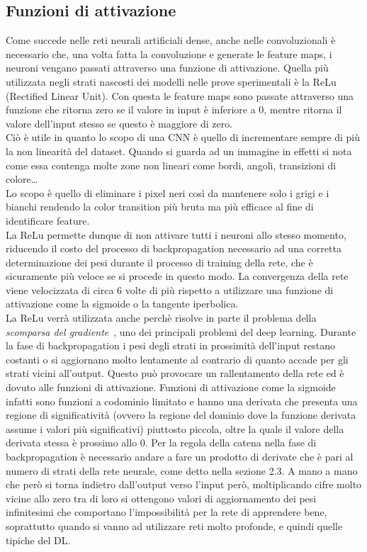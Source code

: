 \subsection{Funzioni di attivazione}
Come succede nelle reti neurali artificiali dense, anche nelle convoluzionali 
è necessario che, una volta fatta la convoluzione e generate le feature maps, i 
neuroni vengano passati attraverso una funzione di attivazione. 
Quella più utilizzata negli strati nascosti dei modelli nelle prove sperimentali è la ReLu
 (Rectified Linear Unit). Con questa le feature maps sono passate attraverso una
  funzione che ritorna zero se il valore in input è inferiore a 0, mentre ritorna il valore
   dell’input stesso se questo è maggiore di zero. \\
   Ciò è utile in quanto lo scopo di una CNN è quello di incrementare sempre di più la non
    linearità del dataset. Quando si guarda ad un immagine in effetti si nota come essa
     contenga molte zone non lineari come bordi, angoli, transizioni di colore… \\
     Lo scopo è quello di eliminare i pixel neri così da mantenere solo i grigi e i bianchi 
     rendendo la color transition più bruta ma più efficace al fine di identificare feature.\\
       La ReLu permette dunque di non attivare tutti i neuroni allo stesso momento, riducendo 
       il costo del processo di backpropagation necessario ad una corretta determinazione
        dei pesi durante il processo di training della rete, che è sicuramente più veloce
         se si procede in questo modo.
La convergenza della rete viene velocizzata di circa 6 volte di più rispetto
 a utilizzare una funzione di attivazione come la sigmoide o la tangente iperbolica.\\
 La ReLu verrà utilizzata anche perchè risolve in parte il problema della \emph{scomparsa del gradiente}~\cite{grad},
  uno dei 
 principali problemi del deep learning. Durante la fase di backpropagation i pesi degli strati in
  prossimità dell’input restano costanti o si aggiornano molto lentamente al contrario di quanto 
  accade per gli strati vicini all’output. Questo può provocare un rallentamento della rete ed è dovuto 
  alle funzioni di attivazione. Funzioni di attivazione come la sigmoide infatti sono funzioni a codominio
   limitato e hanno una derivata
    che presenta una regione di significatività (ovvero la regione del dominio dove la funzione derivata assume
     i valori più significativi) piuttosto piccola, oltre la quale il valore della derivata stessa
     è prossimo allo 0. Per la regola della catena nella fase di backpropagation è necessario 
     andare a fare un
      prodotto di derivate che è pari al numero di strati della rete neurale, come detto nella sezione 2.3.
       A mano a mano che però si torna 
      indietro dall’output verso l’input però, moltiplicando cifre molto 
      vicine allo zero tra di loro si
       ottengono valori di aggiornamento dei pesi infinitesimi che comportano l'impossibilità 
       per la rete di apprendere bene, soprattutto quando si vanno ad utilizzare reti 
       molto profonde, e quindi quelle tipiche del DL.


